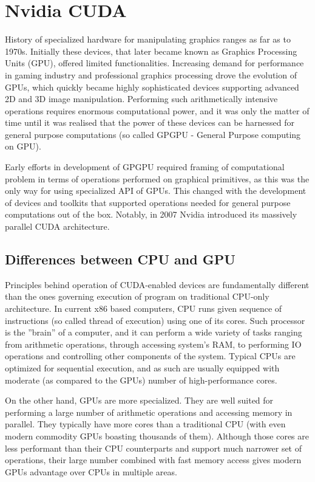 \section{Nvidia CUDA}
History of specialized hardware for manipulating graphics ranges as far as to 1970s. Initially these devices, that later became known as Graphics Processing Units (GPU), offered limited functionalities. Increasing demand for performance in gaming industry and professional graphics processing drove the evolution of GPUs, which quickly became highly sophisticated devices supporting advanced 2D and 3D image manipulation. Performing such arithmetically intensive operations requires enormous computational power, and it was only the matter of time until it was realised that the power of these devices can be harnessed for general purpose computations (so called GPGPU - General Purpose computing on GPU). 

Early efforts in development of GPGPU required framing of computational problem in terms of operations performed on graphical primitives, as this was the only way for using specialized API of GPUs. This changed with the development of devices and toolkits that supported operations needed for general purpose computations out of the box. Notably, in 2007 Nvidia introduced its massively parallel CUDA architecture.

\subsection{Differences between CPU and GPU}
Principles behind operation of CUDA-enabled devices are fundamentally different than the ones governing execution of program on traditional CPU-only architecture. In current x86 based computers, CPU runs given sequence of instructions (so called thread of execution) using one of its cores. Such processor is the ''brain'' of a computer, and it can perform a wide variety of tasks ranging from arithmetic operations, through accessing system's RAM, to performing IO operations and controlling other components of the system. Typical CPUs are optimized for sequential execution, and as such are usually equipped with moderate (as compared to the GPUs) number of high-performance cores. 

On the other hand, GPUs are more specialized. They are well suited for performing a large number of arithmetic operations and accessing memory in parallel. They typically have more cores than a traditional CPU (with even modern commodity GPUs boasting thousands of them). Although those cores are less performant than their CPU counterparts and support much narrower set of operations, their large number combined with fast memory access gives modern GPUs advantage over CPUs in multiple areas.

